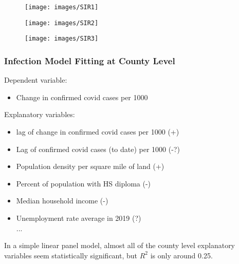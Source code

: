 \documentclass{beamer}
\begin{document}
\begin{frame}
	
	\begin{figure}
		\centering
		\texttt{[image: images/SIR1]}
	\end{figure}
	
\end{frame}

\begin{frame}	
	\begin{figure}
		\centering
		\texttt{[image: images/SIR2]}
	\end{figure}	
\end{frame}

\begin{frame}	
	\begin{figure}
		\centering
		\texttt{[image: images/SIR3]}
	\end{figure}	
\end{frame}

\begin{frame}
	\frametitle{Infection Model Fitting at County Level}
	
Dependent variable:\\
\begin{itemize}
	\item Change in confirmed covid cases per 1000 
\end{itemize}
		
\medskip

Explanatory variables:
\begin{itemize}
	\item lag of change in confirmed covid cases per 1000  (+)
	\item Lag of confirmed covid cases (to date) per 1000 (-?)
	\item Population density per square mile of land (+)
	\item Percent of population with HS diploma (-)
	\item Median household income (-)
	\item Unemployment rate average in 2019 (?) \\
	... 
\end{itemize}
	
In a simple linear panel model, almost all of the county level explanatory variables seem statistically significant, but $R^2$ is only around 0.25. 	

\end{frame}
\end{document}
